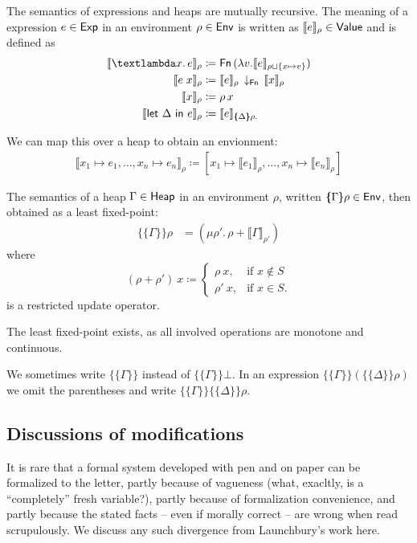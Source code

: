\documentclass{jfp1}
\theoremstyle{nonumberbreak}
\newcommand{\sExp}   {\text{\textsf{Exp}}}
\newcommand{\sHeap}  {\text{\textsf{Heap}}}
\newcommand{\sValue} {\text{\textsf{Value}}}
\newcommand{\sEnv}   {\text{\textsf{Env}}}
\newcommand{\sFn}[1]{\text{\textsf{Fn}}\,(#1)}
\newcommand{\sFnProj}[2]{#1\,\downarrow_{\text{\textsf{Fn}}}\,#2}
\newcommand{\keyword}[1]{\text{\textsf{#1}}}
\newcommand{\sApp}[2]{#1\;#2}
\newcommand{\sLam}[2]{\text{\textlambda} #1.\, #2}
\newcommand{\sLet}[2]{\keyword{let}~#1~\keyword{in}~#2}
\newcommand{\dom}[1]{\text{dom}\;#1}
\newcommand{\xen}{x_1\mapsto e_1, \ldots, x_n\mapsto e_n}
\newcommand{\dsem}[2]{\llbracket #1 \rrbracket_{#2}}
\newcommand{\esem}[1]{\{\!\!\!\{#1\}\!\!\!\}}
\newcommand{\upd}[1]{\mathop{++_{#1}}}
\begin{document}
The semantics of expressions and heaps are mutually recursive. The meaning of a expression $e \in \sExp$ in an environment $\rho \in \sEnv$ is written as $\dsem e \rho \in \sValue$ and is defined as
\begin{align*}
\dsem{\sLam x e}\rho &\coloneqq \sFn{\lambda v. \dsem e {\rho \sqcup \{x \mapsto v\}}}\\
\dsem{\sApp e  x}\rho &\coloneqq \sFnProj {\dsem e \rho}{\dsem x \rho}\\
\dsem{x}\rho &\coloneqq \rho\,x\\
\dsem{\sLet{\Delta}e}\rho &\coloneqq \dsem e {\esem{\Delta}\rho.}
\end{align*}

We can map this over a heap to obtain an envionment:
\begin{align*}
\dsem{\xen}\rho \coloneqq [x_1 \mapsto \dsem{e_1}{\rho}, \ldots, x_n \mapsto \dsem{e_n}{\rho}]
\end{align*}

The semantics of a heap $\Gamma \in \sHeap$ in an environment $\rho$, written $\esem \Gamma \rho \in \sEnv$, then obtained as a least  fixed-point:
\begin{align*}
\esem{\Gamma}\rho &= (\mu \rho'.\, \rho \upd{\dom \Gamma} \dsem{\Gamma}{\rho'})
\end{align*}
where
\[
(\rho \upd{S} \rho')~x \coloneqq
\begin{cases}
\rho~x, &\text{if } x \notin S \\
\rho'~x, &\text{if } x \in S.
\end{cases}
\]
is a restricted update operator.

The least fixed-point exists, as all involved operations are monotone and continuous.

We sometimes write $\esem{\Gamma}$ instead of $\esem{\Gamma}{\bot}$. In an expression $\esem{\Gamma}(\esem{\Delta}\rho)$ we omit the parentheses and write $\esem{\Gamma}\esem{\Delta}\rho$.


\subsection{Discussions of modifications}
\label{sec_modifications1}

It is rare that a formal system developed with pen and on paper can be formalized to the letter, partly because of vagueness (what, exacltly, is a ``completely'' fresh variable?), partly because of formalization convenience, and partly because the stated facts -- even if morally correct -- are wrong when read scrupulously. We discuss any such divergence from Launchbury's work here.
\end{document}
